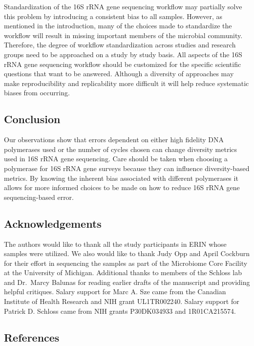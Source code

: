 \documentclass[11pt,]{article}
\begin{document}
Standardization of the 16S rRNA gene sequencing workflow may partially
solve this problem by introducing a consistent bias to all samples.
However, as mentioned in the introduction, many of the choices made to
standardize the workflow will result in missing important members of the
microbial community. Therefore, the degree of workflow standardization
across studies and research groups need to be approached on a study by
study basis. All aspects of the 16S rRNA gene sequencing workflow should
be customized for the specific scientific questions that want to be
answered. Although a diversity of approaches may make reproducibility
and replicability more difficult it will help reduce systematic biases
from occurring.

\newpage

\subsection{Conclusion}\label{conclusion}

Our observations show that errors dependent on either high fidelity DNA
polymerases used or the number of cycles chosen can change diversity
metrics used in 16S rRNA gene sequencing. Care should be taken when
choosing a polymerase for 16S rRNA gene surveys because they can
influence diversity-based metrics. By knowing the inherent bias
associated with different polymerases it allows for more informed
choices to be made on how to reduce 16S rRNA gene sequencing-based
error.

\newpage

\subsection{Acknowledgements}\label{acknowledgements}

The authors would like to thank all the study participants in ERIN whose
samples were utilized. We also would like to thank Judy Opp and April
Cockburn for their effort in sequencing the samples as part of the
Microbiome Core Facility at the University of Michigan. Additional
thanks to members of the Schloss lab and Dr.~Marcy Balunas for reading
earlier drafts of the manuscript and providing helpful critiques. Salary
support for Marc A. Sze came from the Canadian Institute of Health
Research and NIH grant UL1TR002240. Salary support for Patrick D.
Schloss came from NIH grants P30DK034933 and 1R01CA215574.

\newpage

\subsection{References}\label{references}
\end{document}
